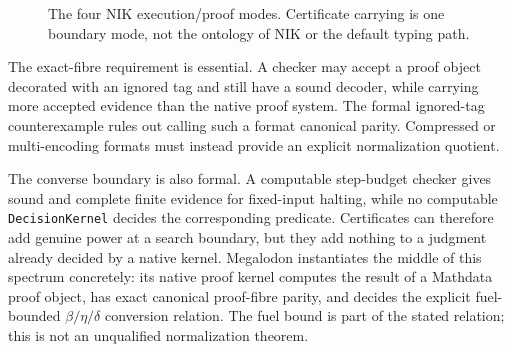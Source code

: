 \documentclass[11pt]{article}
\newcommand{\code}[1]{\texttt{#1}}
\begin{document}
\begin{figure}[ht]
\centering
{}
\caption{The four NIK execution/proof modes.  Certificate carrying is one
boundary mode, not the ontology of NIK or the default typing path.}
\label{fig:nik-four-modes}
\end{figure}

The exact-fibre requirement is essential.  A checker may accept a proof object
decorated with an ignored tag and still have a sound decoder, while carrying more
accepted evidence than the native proof system.  The formal ignored-tag
counterexample rules out calling such a format canonical parity.  Compressed or
multi-encoding formats must instead provide an explicit normalization quotient.

The converse boundary is also formal.  A computable step-budget checker gives
sound and complete finite evidence for fixed-input halting, while no computable
\code{DecisionKernel} decides the corresponding predicate.  Certificates can
therefore add genuine power at a search boundary, but they add nothing to a
judgment already decided by a native kernel.  Megalodon instantiates the middle
of this spectrum concretely: its native proof kernel computes the result of a
Mathdata proof object, has exact canonical proof-fibre parity, and decides the
explicit fuel-bounded $\beta/\eta/\delta$ conversion relation.  The fuel bound is
part of the stated relation; this is not an unqualified normalization theorem.
\end{document}
